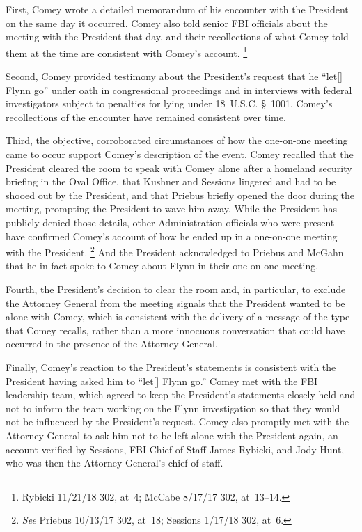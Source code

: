 First, Comey wrote a detailed memorandum of his encounter with the President on the same day it occurred.
Comey also told senior FBI officials about the meeting with the President that day, and their recollections of what Comey told them at the time are consistent with Comey's account.%
\footnote{Rybicki 11/21/18 302, at~4;
McCabe 8/17/17 302, at~13--14.}

Second, Comey provided testimony about the President's request that he ``let[] Flynn go'' under oath in congressional proceedings and in interviews with federal investigators subject to penalties for lying under 18~U.S.C. \S~1001.
Comey's recollections of the encounter have remained consistent over time.

Third, the objective, corroborated circumstances of how the one-on-one meeting came to occur support Comey's description of the event.
Comey recalled that the President cleared the room to speak with Comey alone after a homeland security briefing in the Oval Office, that Kushner and Sessions lingered and had to be shooed out by the President, and that Priebus briefly opened the door during the meeting, prompting the President to wave him away.
While the President has publicly denied those details, other Administration officials who were present have confirmed Comey's account of how he ended up in a one-on-one meeting with the President.%
\footnote{\textit{See} Priebus 10/13/17 302, at~18;
Sessions 1/17/18 302, at~6.}
And the President acknowledged to Priebus and McGahn that he in fact spoke to Comey about Flynn in their one-on-one meeting.

Fourth, the President's decision to clear the room and, in particular, to exclude the Attorney General from the meeting signals that the President wanted to be alone with Comey, which is consistent with the delivery of a message of the type that Comey recalls, rather than a more innocuous conversation that could have occurred in the presence of the Attorney General.

Finally, Comey's reaction to the President's statements is consistent with the President having asked him to ``let[] Flynn go.''
Comey met with the FBI leadership team, which agreed to keep the President's statements closely held and not to inform the team working on the Flynn investigation so that they would not be influenced by the President's request.
Comey also promptly met with the Attorney General to ask him not to be left alone with the President again, an account verified by Sessions, FBI Chief of Staff James Rybicki, and Jody Hunt, who was then the Attorney General's chief of staff.

